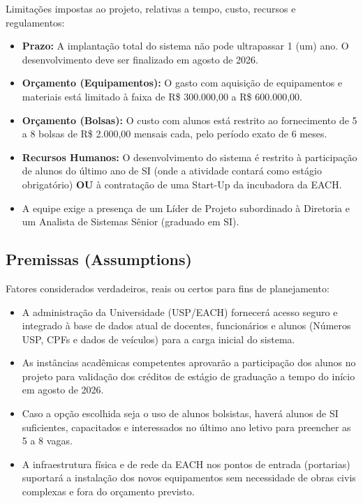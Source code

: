 \documentclass[a4paper]{article}
\begin{document}
Limitações impostas ao projeto, relativas a tempo, custo, recursos e regulamentos:

\begin{itemize}
    \item \textbf{Prazo:} A implantação total do sistema não pode ultrapassar 1 (um) ano. O desenvolvimento deve ser finalizado em agosto de 2026.
    \item \textbf{Orçamento (Equipamentos):} O gasto com aquisição de equipamentos e materiais está limitado à faixa de R\$ 300.000,00 a R\$ 600.000,00.
    \item \textbf{Orçamento (Bolsas):} O custo com alunos está restrito ao fornecimento de 5 a 8 bolsas de R\$ 2.000,00 mensais cada, pelo período exato de 6 meses.
    \item \textbf{Recursos Humanos:} O desenvolvimento do sistema é restrito à participação de alunos do último ano de SI (onde a atividade contará como estágio obrigatório) \textbf{OU} à contratação de uma Start-Up da incubadora da EACH.
    \item A equipe exige a presença de um Líder de Projeto subordinado à Diretoria e um Analista de Sistemas Sênior (graduado em SI).
\end{itemize}

\subsection{Premissas (Assumptions)}

Fatores considerados verdadeiros, reais ou certos para fins de planejamento:

\begin{itemize}
    \item A administração da Universidade (USP/EACH) fornecerá acesso seguro e integrado à base de dados atual de docentes, funcionários e alunos (Números USP, CPFs e dados de veículos) para a carga inicial do sistema.
    \item As instâncias acadêmicas competentes aprovarão a participação dos alunos no projeto para validação dos créditos de estágio de graduação a tempo do início em agosto de 2026.
    \item Caso a opção escolhida seja o uso de alunos bolsistas, haverá alunos de SI suficientes, capacitados e interessados no último ano letivo para preencher as 5 a 8 vagas.
    \item A infraestrutura física e de rede da EACH nos pontos de entrada (portarias) suportará a instalação dos novos equipamentos sem necessidade de obras civis complexas e fora do orçamento previsto.
\end{itemize}
\end{document}
